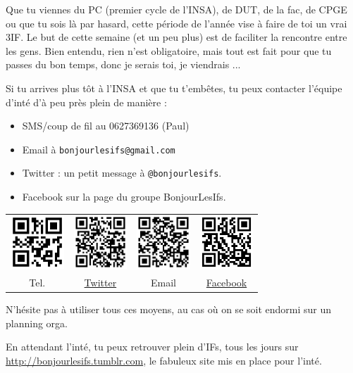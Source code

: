 Que tu viennes du PC (premier cycle de l'INSA), de DUT, de la fac, de CPGE ou que tu sois là par hasard, cette période de l'année vise à faire de toi un vrai 3IF. Le but de cette semaine (et un peu plus) est de faciliter la rencontre entre les gens. Bien entendu, rien n'est obligatoire, mais tout est fait pour que tu passes du bon temps, donc je serais toi, je viendrais ...

Si tu arrives plus tôt à l'INSA et que tu t'embêtes, tu peux contacter l'équipe d'inté d'à peu près plein de manière :
\begin{itemize}
      \item SMS/coup de fil au 0627369136 (Paul)
      \item Email à \texttt{bonjourlesifs@gmail.com}
      \item Twitter : un petit message à \texttt{@bonjourlesifs}.
      \item Facebook sur la page du groupe BonjourLesIfs.
\end{itemize}

\vspace{0.5cm}

{
    \hspace{-2cm}
\begin{tabular}{cccc}
	\includegraphics[height=2cm]{images/telPaulQRcode.png} & \includegraphics[height=2cm]{images/qrcodeBjrLesIfsTwitter.png} & \includegraphics[height=2cm]{images/qrcodeEmail.png} & \includegraphics[height=2cm]{images/qrcodeFacebook.png} \\
	Tel. & \href{http://twitter.com/bonjourlesifs}{Twitter} & Email &
	\href{http://www.facebook.com/group.php?gid=120929821278518}{Facebook}\\
\end{tabular}
}

\vspace{0.5cm}
N'hésite pas à utiliser tous ces moyens, au cas où on se soit endormi sur un planning orga. 

En attendant l'inté, tu peux retrouver plein d'IFs, tous les jours sur
\url{http://bonjourlesifs.tumblr.com}, le fabuleux site mis en place pour
l'inté.
